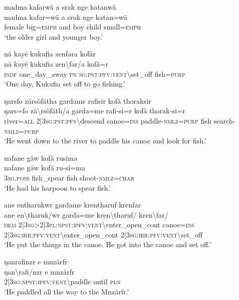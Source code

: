 \ea\label{ex:9:a2235}
madma kafarwä a srak nge katanwä\\
\gll madma	kafar=wä	a	srak	nge	katan=wä\\
     female	big=\textsc{emph}	and	boy	child	small=\textsc{emph}\\
\glt `the older girl and younger boy.'
\z

\ea\label{ex:9:a2238}
nä kayé kukufia zenfara kofär\\
\gll nä	kayé	kukufia	zen{\textbackslash}far/a	kofä=r\\
     \textsc{indf}	one\_day\_away	\textsc{pn}	\textsc{sg}:\textsc{pst}:\textsc{pfv}:\textsc{vent}{\textbackslash}set\_off	fish=\textsc{purp}\\
\glt `One day, Kukufia set off to go fishing.'
\z

\ea\label{ex:9:a2241}
ŋarsfo zärsöfätha gardame rafisir kofä thoraksir\\
\gll ŋars=fo	zä{\textbackslash}rsöfäth/a	garda=me	rafi-si=r	kofä	thorak-si=r\\
     river=\textsc{all}	2|3\textsc{sg}:\textsc{pst}:\textsc{pfv}{\textbackslash}descend	canoe=\textsc{ins}	paddle-\textsc{nmlz}=\textsc{purp}	fish	search-\textsc{nmlz}=\textsc{purp}\\
\glt `He went down to the river to paddle his canoe and look for fish.'
\z

\ea\label{ex:9:a2243}
nafane gäw kofä rusima\\
\gll nafane	gäw	kofä	ru-si=ma\\
     3\textsc{sg}.\textsc{poss}	fish\_spear	fish	shoot-\textsc{nmlz}=\textsc{char}\\
\glt `He had his harpoon to spear fish.'
\z

\ea\label{ex:9:a2245}
ane entharukwr gardame krentharuf krenfar\\
\gll ane	en{\textbackslash}tharuk/wr	garda=me	kren{\textbackslash}tharuf/	kren{\textbackslash}far/\\
     \textsc{dem}	2|3\textsc{sg}>2|3\textsc{pl}:\textsc{npst}:\textsc{ipfv}:\textsc{vent}{\textbackslash}enter\_open\_cont	canoe=\textsc{ins}	2|3\textsc{sg}:\textsc{irr}:\textsc{pfv}:\textsc{vent}{\textbackslash}enter\_open\_cont	2|3\textsc{sg}:\textsc{irr}:\textsc{pfv}:\textsc{vent}{\textbackslash}set\_off\\
\glt `He put the things in the canoe. He got into the canoe and set off.'
\z

\ea\label{ex:9:a2246}
ŋanrafinzr e mnzärfr\\
\gll ŋan{\textbackslash}rafi/nzr	e	mnzärfr\\
     2|3\textsc{sg}:\textsc{npst}:\textsc{ipfv}:\textsc{vent}{\textbackslash}paddle	until	\textsc{pln}\\
\glt `He paddled all the way to the Mnzärfr.'
\z

